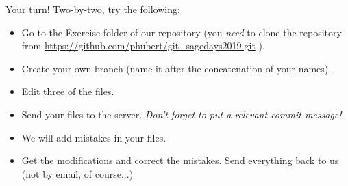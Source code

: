 \documentclass{beamer}
\begin{document}
	\begin{frame}{Your turn!}
	Two-by-two, try the following:
		\begin{itemize}
			\item Go to the Exercise folder of our repository (you \textit{need} to clone the repository from \url{https://github.com/phubert/git_sagedays2019.git} ).
			\item Create your own branch (name it after the concatenation of your names).
			\item Edit three of the files.
			\item Send your files to the server. \textit{Don't forget to put a relevant commit message!}
			\item We will add mistakes in your files.
			\item Get the modifications and correct the mistakes. Send everything back to us (not by email, of course...)
		\end{itemize}
	\end{frame}
\end{document}

